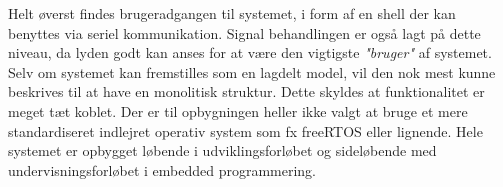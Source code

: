 Helt øverst findes brugeradgangen til systemet, i form af en shell der kan benyttes via seriel kommunikation.
Signal behandlingen er også lagt på dette niveau, da lyden godt kan anses for at være den vigtigste \textit{"bruger"} af systemet.\\

Selv om systemet kan fremstilles som en lagdelt model, vil den nok mest kunne beskrives til at have en monolitisk struktur.
Dette skyldes at funktionalitet er meget tæt koblet.
Der er til opbygningen heller ikke valgt at bruge et mere standardiseret indlejret operativ system som fx freeRTOS eller lignende.
Hele systemet er opbygget løbende i udviklingsforløbet og sideløbende med undervisningsforløbet i embedded programmering.  


\FloatBlock